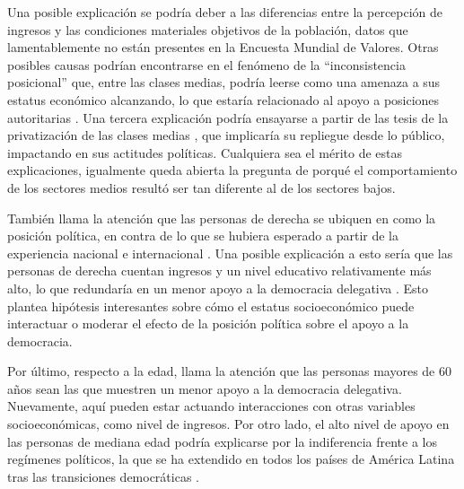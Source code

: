 \documentclass[12pt,twoside]{templates/facsothesis}
\begin{document}
Una posible explicación se podría deber a las diferencias entre la percepción de ingresos y las condiciones materiales objetivos de la población, datos que lamentablemente no están presentes en la Encuesta Mundial de Valores. Otras posibles causas podrían encontrarse en el fenómeno de la ``inconsistencia posicional'' \citep{araujo2012} que, entre las clases medias, podría leerse como una amenaza a sus estatus económico alcanzando, lo que estaría relacionado al apoyo a posiciones autoritarias \citep{arikan2019}. Una tercera explicación podría ensayarse a partir de las tesis de la privatización de las clases medias \citep{mendez2012}, que implicaría su repliegue desde lo público, impactando en sus actitudes políticas. Cualquiera sea el mérito de estas explicaciones, igualmente queda abierta la pregunta de porqué el comportamiento de los sectores medios resultó ser tan diferente al de los sectores bajos.

También llama la atención que las personas de derecha se ubiquen en como la posición política, en contra de lo que se hubiera esperado a partir de la experiencia nacional \citep{navia2019} e internacional \citep{donovan2021}. Una posible explicación a esto sería que las personas de derecha cuentan ingresos y un nivel educativo relativamente más alto, lo que redundaría en un menor apoyo a la democracia delegativa \citep{kang2018}. Esto plantea hipótesis interesantes sobre cómo el estatus socioeconómico puede interactuar o moderar el efecto de la posición política sobre el apoyo a la democracia.

Por último, respecto a la edad, llama la atención que las personas mayores de 60 años sean las que muestren un menor apoyo a la democracia delegativa. Nuevamente, aquí pueden estar actuando interacciones con otras variables socioeconómicas, como nivel de ingresos. Por otro lado, el alto nivel de apoyo en las personas de mediana edad podría explicarse por la indiferencia frente a los regímenes políticos, la que se ha extendido en todos los países de América Latina tras las transiciones democráticas \citep{monsivais-carrillo2019}.
\end{document}
